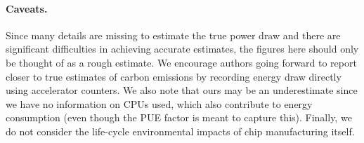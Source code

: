 \paragraph{Caveats.} Since many details are missing to estimate the true power draw and there are significant difficulties in achieving accurate estimates, the figures here should only be thought of as a rough estimate. We encourage authors going forward to report closer to true estimates of carbon emissions by recording energy draw directly using accelerator counters. We also note that ours may be an underestimate since we have no information on CPUs used, which also contribute to energy consumption (even though the PUE factor is meant to capture this). Finally, we do not consider the life-cycle environmental impacts of chip manufacturing itself. 



